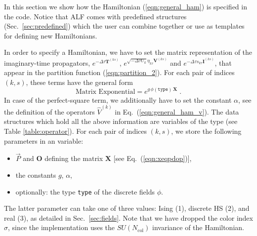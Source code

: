 In this section we show how the Hamiltonian (\ref{eqn:general_ham}) is specified in the code. Notice that ALF comes with predefined structures (Sec.~\ref{sec:predefined}) which the user can combine together or use as templates for defining new Hamiltonians.

In order to specify a Hamiltonian, we have to set the matrix representation of the imaginary-time propagators,
$ e^{-\Delta \tau {\bm T}^{(ks)}}$, $e^{  \sqrt{- \Delta \tau  U_k} \eta_{k\tau} {\bm V}^{(ks)} }$ and $e^{  -\Delta \tau s_{k\tau}  {\bm I}^{(ks)}}$, that appear in the 
partition function (\ref{eqn:partition_2}).  For each pair of indices $(k,s)$, these terms have the general form
\begin{equation}\label{eqn:exponent_mat}
\text{Matrix Exponential}=
e^{g \,\phi(\texttt{type})\,\bm{X} }\;.
\end{equation}
In case of the  perfect-square term,  we additionally have to set the constant $\alpha$, see the definition of the operators $\hat{V}^{(k)}$ in Eq.~(\ref{eqn:general_ham_v}).
The data structures which hold all the above information are variables of the type  (see Table \ref{table:operator}). 
For each pair of indices $(k,s)$, we store the following parameters in an  variable:
\begin{itemize}
\item $\vec{P}$ and   $ \bm{O}$   defining the matrix $\bm{X}$ [see Eq.~(\ref{eqn:xeqpdop})],
\item the constants $g$, $\alpha$,
\item optionally: the type \texttt{type} of the discrete fields $\phi$.
\end{itemize}
The latter parameter can take one of three values: Ising (1), discrete HS (2), and real (3), as detailed in Sec.~\ref{sec:fields}.
Note that we have dropped the color index $\sigma$, since the implementation uses the $SU(N_{\mathrm{col}})$ invariance of the Hamiltonian. 

